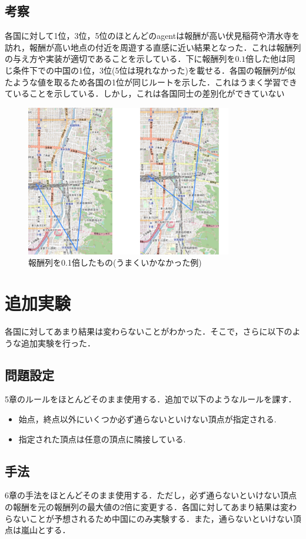 \documentclass[a4paper,12pt]{jsreport}
\theoremstyle{definition}
\begin{document}
\section{考察}
各国に対して1位，3位，5位のほとんどのagentは報酬が高い伏見稲荷や清水寺を訪れ，報酬が高い地点の付近を周遊する直感に近い結果となった．これは報酬列の与え方や実装が適切であることを示している．下に報酬列を$0.1$倍した他は同じ条件下での中国の1位，3位(5位は現れなかった)を載せる．各国の報酬列が似たような値を取るため各国の1位が同じルートを示した．これはうまく学習できていることを示している．しかし，これは各国同士の差別化ができていない
\begin{figure}
    \centering
    \includegraphics[width=9cm]{png/01.png}
    \caption{報酬列を0.1倍したもの(うまくいかなかった例)}
    \label{fig:01}
\end{figure}


\chapter{追加実験}
各国に対してあまり結果は変わらないことがわかった．そこで，さらに以下のような追加実験を行った．
\section{問題設定}
5章のルールをほとんどそのまま使用する．追加で以下のようなルールを課す．
\begin{itemize}
    \item 始点，終点以外にいくつか必ず通らないといけない頂点が指定される.
    \item 指定された頂点は任意の頂点に隣接している.
\end{itemize}
\section{手法}
6章の手法をほとんどそのまま使用する．ただし，必ず通らないといけない頂点の報酬を元の報酬列の最大値の2倍に変更する．各国に対してあまり結果は変わらないことが予想されるため中国にのみ実験する．また，通らないといけない頂点は嵐山とする．
\end{document}
